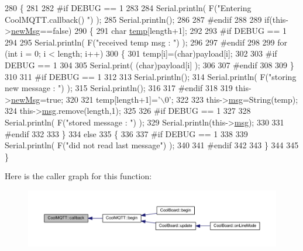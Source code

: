 \begin{DoxyCode}
280 \{
281 
282 \textcolor{preprocessor}{#if DEBUG == 1}
283 
284     Serial.println( F(\textcolor{stringliteral}{"Entering CoolMQTT.callback() "}) );
285     Serial.println();
286 
287 \textcolor{preprocessor}{#endif }
288 
289     \textcolor{keywordflow}{if}(this->\hyperlink{classCoolMQTT_a3240388137b885775aadf38e96b24c6b}{newMsg}==\textcolor{keyword}{false})
290     \{
291         \textcolor{keywordtype}{char} \hyperlink{Irene3000_8h_a5905d48604152cf57aa6bfa087b49173}{temp}[length+1];
292 
293 \textcolor{preprocessor}{    #if DEBUG == 1}
294 
295         Serial.println( F(\textcolor{stringliteral}{"received temp msg : "}) );
296 
297 \textcolor{preprocessor}{    #endif}
298         
299         \textcolor{keywordflow}{for} (\textcolor{keywordtype}{int} i = 0; i < length; i++) 
300         \{
301             temp[i]=(char)payload[i];
302         
303 \textcolor{preprocessor}{        #if DEBUG == 1 }
304 
305             Serial.print( (\textcolor{keywordtype}{char})payload[i] );
306         
307 \textcolor{preprocessor}{        #endif}
308 
309         \}
310     
311 \textcolor{preprocessor}{    #if DEBUG == 1 }
312 
313         Serial.println();
314         Serial.println( F(\textcolor{stringliteral}{"storing new message : "}) );
315         Serial.println();
316     
317 \textcolor{preprocessor}{    #endif}
318 
319         this->\hyperlink{classCoolMQTT_a3240388137b885775aadf38e96b24c6b}{newMsg}=\textcolor{keyword}{true};
320 
321         temp[length+1]=\textcolor{charliteral}{'\(\backslash\)0'};
322 
323         this->\hyperlink{classCoolMQTT_af6b19e7074dbbb4ae493c44dcb53f7ff}{msg}=String(temp);
324         this->\hyperlink{classCoolMQTT_af6b19e7074dbbb4ae493c44dcb53f7ff}{msg}.remove(length,1);
325     
326 \textcolor{preprocessor}{    #if DEBUG == 1 }
327 
328         Serial.println( F(\textcolor{stringliteral}{"stored message : "}) );
329         Serial.println(this->\hyperlink{classCoolMQTT_af6b19e7074dbbb4ae493c44dcb53f7ff}{msg});
330     
331 \textcolor{preprocessor}{    #endif}
332 
333     \}
334     \textcolor{keywordflow}{else}
335     \{
336     
337 \textcolor{preprocessor}{    #if DEBUG == 1}
338 
339         Serial.println( F(\textcolor{stringliteral}{"did not read last message"}) );
340     
341 \textcolor{preprocessor}{    #endif }
342         
343     \}
344 
345 \}
\end{DoxyCode}
Here is the caller graph for this function\+:
\nopagebreak
\begin{figure}[H]
\begin{center}
\leavevmode
\includegraphics[width=350pt]{classCoolMQTT_a30d82ad665bfb603f46ecdbc290775df_icgraph}
\end{center}
\end{figure}
\mbox{\label{classCoolMQTT_a9b703de4f1358f0ee7a5e8c44979c648}} 
